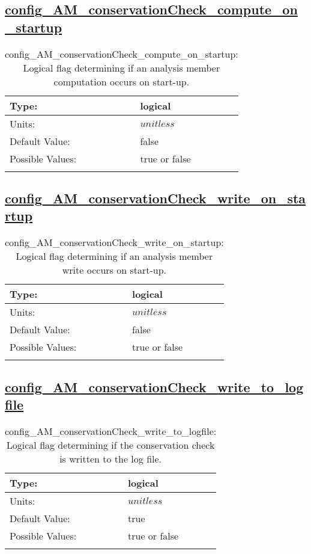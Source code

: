 \subsection[config\_AM\_conservationCheck\_compute\_on\_startup]{\hyperref[sec:nm_tab_AM_conservationCheck]{config\_AM\_conservationCheck\_compute\_on\_startup}}
\label{subsec:nm_sec_config_AM_conservationCheck_compute_on_startup}
\begin{center}
\begin{longtable}{| p{2.0in} || p{4.0in} |}
    \hline
    Type: & logical \\
    \hline
    Units: & $unitless$ \\
    \hline
    Default Value: & false \\
    \hline
    Possible Values: & true or false \\
    \hline
    \caption{config\_AM\_conservationCheck\_compute\_on\_startup: Logical flag determining if an analysis member computation occurs on start-up.}
\end{longtable}
\end{center}
\subsection[config\_AM\_conservationCheck\_write\_on\_startup]{\hyperref[sec:nm_tab_AM_conservationCheck]{config\_AM\_conservationCheck\_write\_on\_startup}}
\label{subsec:nm_sec_config_AM_conservationCheck_write_on_startup}
\begin{center}
\begin{longtable}{| p{2.0in} || p{4.0in} |}
    \hline
    Type: & logical \\
    \hline
    Units: & $unitless$ \\
    \hline
    Default Value: & false \\
    \hline
    Possible Values: & true or false \\
    \hline
    \caption{config\_AM\_conservationCheck\_write\_on\_startup: Logical flag determining if an analysis member write occurs on start-up.}
\end{longtable}
\end{center}
\subsection[config\_AM\_conservationCheck\_write\_to\_logfile]{\hyperref[sec:nm_tab_AM_conservationCheck]{config\_AM\_conservationCheck\_write\_to\_logfile}}
\label{subsec:nm_sec_config_AM_conservationCheck_write_to_logfile}
\begin{center}
\begin{longtable}{| p{2.0in} || p{4.0in} |}
    \hline
    Type: & logical \\
    \hline
    Units: & $unitless$ \\
    \hline
    Default Value: & true \\
    \hline
    Possible Values: & true or false \\
    \hline
    \caption{config\_AM\_conservationCheck\_write\_to\_logfile: Logical flag determining if the conservation check is written to the log file.}
\end{longtable}
\end{center}
